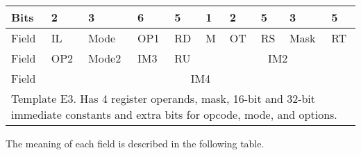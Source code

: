\documentclass[forwardcom.tex]{subfiles}
\begin{document}
\begin{longtable}[l]{|p{8mm}|p{8mm}|p{8mm}|p{8mm}|p{8mm}|p{8mm}|p{8mm}|p{8mm}|p{8mm}|p{8mm}|}
\endfirsthead
\label{table:templateE3}
\endhead
\hline
 Bits & 2 & 3 & 6 & 5 & 1 & 2 & 5 & 3 & 5 \\
\hline
Field & IL & Mode & OP1 & RD & M & OT & RS & Mask & RT \\
\hline
Field & OP2 & \small Mode2 & IM3 & RU & \multicolumn{5}{|c|}{ IM2 } \\
\hline
Field & \multicolumn{9}{|c|}{ IM4 } \\   
\hline
\multicolumn{10}{|p{118mm}|}{
Template E3. Has 4 register operands, mask, 16-bit and 32-bit immediate constants and extra bits for opcode, mode, and options.} \\
\hline
\end{longtable}
\vspace{2mm}

The meaning of each field is described in the following table.
\end{document}
